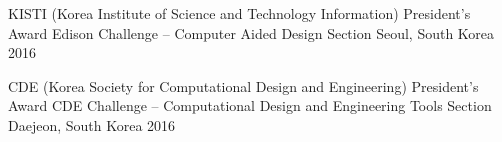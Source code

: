 

\begin{cvhonors}


\cvhonor
{KISTI (Korea Institute of Science and Technology Information) President’s Award} %
{Edison Challenge –  Computer Aided Design Section} %
{Seoul, South Korea} %
{2016} %


\cvhonor
{CDE (Korea Society for Computational Design and Engineering) President’s Award} %
{CDE Challenge – Computational Design and Engineering Tools Section} %
{Daejeon, South Korea} %
{2016} %


\end{cvhonors}